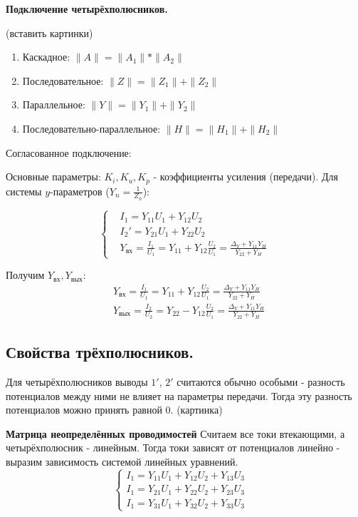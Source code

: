 \documentclass[a4paper,12pt]{report}
\begin{document}
\textbf{Подключение четырёхполюсников.}

(вставить картинки)
\begin{enumerate}
\item Каскадное: $\|A\|=\|A_1\|*\|A_2\|$


\item Последовательное: $\|Z\|=\|Z_1\|+\|Z_2\|$
\item Параллельное: $\|Y\|=\|Y_1\|+\|Y_2\|$
\item Последовательно-параллельное: $\|H\|=\|H_1\|+\|H_2\|$
\end{enumerate}

Согласованное подключение: 

Основные параметры: $K_i, K_u, K_p$ - коэффициенты усиления (передачи).
Для системы $y$-параметров ($Y_n=\frac{1}{Z_n}$):

  \begin{equation}
  \left\{
\begin{aligned}
&I_1=Y_{11}U_1+Y_{12}U_2\\
&I_2'=Y_{21}U_1+Y_{22}U_2 \\
& Y_\text{вх}=\frac{I_1}{U_1}=Y_11+Y_12\frac{U_2}{U_1}=\frac{\Delta_Y+Y_11Y_H}{Y_22+Y_H}
\end{aligned}
\right.
\end{equation}

Получим $Y_\text{вх}, Y_\text{вых}$:
  \begin{equation}
\begin{aligned}
& Y_\text{вх}=\frac{I_1}{U_1}=Y_{11}+Y_{12}\frac{U_2}{U_1}=\frac{\Delta_Y+Y_{11}Y_H}{Y_{22}+Y_H}\\
& Y_\text{вых}=\frac{I_2}{U_2}=Y_{22}-Y_{12}\frac{U_2}{U_1}=\frac{\Delta_Y+Y_{11}Y_H}{Y_{22}+Y_H}
\end{aligned}
\end{equation}


\subsection{Свойства трёхполюсников.}

Для четырёхполюсников выводы $1'$, $2'$ считаются обычно особыми - разность потенциалов между ними не влияет на параметры передачи. Тогда эту разность потенциалов можно принять равной $0$. (картинка)

\textbf{Матрица неопределённых проводимостей}
Считаем все токи втекающими, а четырёхполюсник - линейным. Тогда токи зависят от потенциалов линейно - выразим зависимость системой линейных уравнений.\\ 
  \begin{equation}
  \left\{
\begin{aligned}
I_1=Y_{11}U_1+Y_{12}U_2+Y_{13}U_3&\\
I_1=Y_{21}U_1+Y_{22}U_2+Y_{23}U_3&\\
I_1=Y_{31}U_1+Y_{32}U_2+Y_{33}U_3&
\end{aligned}
\right.
\end{equation}
\end{document}
